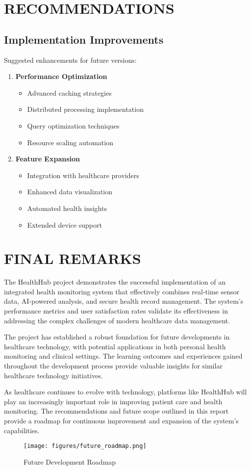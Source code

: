 \section{RECOMMENDATIONS}

\subsection{Implementation Improvements}
Suggested enhancements for future versions:

\begin{enumerate}
    \item \textbf{Performance Optimization}
    \begin{itemize}
        \item Advanced caching strategies
        \item Distributed processing implementation
        \item Query optimization techniques
        \item Resource scaling automation
    \end{itemize}

    \item \textbf{Feature Expansion}
    \begin{itemize}
        \item Integration with healthcare providers
        \item Enhanced data visualization
        \item Automated health insights
        \item Extended device support
    \end{itemize}
\end{enumerate}

\section{FINAL REMARKS}

The HealthHub project demonstrates the successful implementation of an integrated health monitoring system that effectively combines real-time sensor data, AI-powered analysis, and secure health record management. The system's performance metrics and user satisfaction rates validate its effectiveness in addressing the complex challenges of modern healthcare data management.

The project has established a robust foundation for future developments in healthcare technology, with potential applications in both personal health monitoring and clinical settings. The learning outcomes and experiences gained throughout the development process provide valuable insights for similar healthcare technology initiatives.

As healthcare continues to evolve with technology, platforms like HealthHub will play an increasingly important role in improving patient care and health monitoring. The recommendations and future scope outlined in this report provide a roadmap for continuous improvement and expansion of the system's capabilities.

\begin{figure}[H]
    \centering
    \texttt{[image: figures/future\_roadmap.png]}
    \caption{Future Development Roadmap}
\end{figure} 